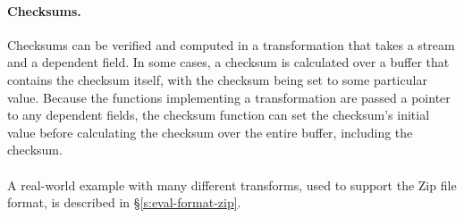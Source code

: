 \paragraph{Checksums.}
Checksums can be verified and computed in a transformation that takes a stream and a dependent
field. In some cases, a checksum is calculated over a buffer that contains the checksum itself, with
the checksum being set to some particular value. Because the functions implementing a transformation
are passed a pointer to any dependent fields, the checksum function can set the checksum's initial
value before calculating the checksum over the entire buffer, including the checksum.


\paragraph{}
A real-world example with many different transforms, used to support
the Zip file format, is described in \S\ref{s:eval-format-zip}.







